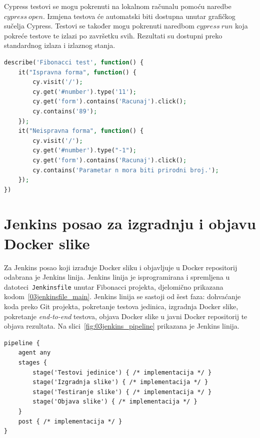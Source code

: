 Cypress testovi se mogu pokrenuti na lokalnom računalu pomoću naredbe $cypress~open$. Izmjena
testova će automatski biti dostupna unutar grafičkog sučelja Cypress. Testovi se također mogu
pokrenuti naredbom $cypress~run$ koja pokreće testove te izlazi po završetku svih. Rezultati su
dostupni preko standardnog izlaza i izlaznog stanja.

\begin{lstlisting}[language=php,float=h]
describe('Fibonacci test', function() {
    it("Ispravna forma", function() {
        cy.visit('/');
        cy.get('#number').type('11');
        cy.get('form').contains('Racunaj').click();
        cy.contains('89');
    });
    it("Neispravna forma", function() {
        cy.visit('/');
        cy.get('#number').type("-1");
        cy.get('form').contains('Racunaj').click();
        cy.contains('Parametar n mora biti prirodni broj.');
    });
})
\end{lstlisting}

\section{Jenkins posao za izgradnju i objavu Docker slike}
Za Jenkins posao koji izrađuje Docker sliku i objavljuje u Docker repositorij odabrana je Jenkins
linija. Jenkins linija je isprogramirana i spremljena u datoteci~\texttt{Jenkinsfile} unutar
Fibonacci projekta, djelomično prikazana kodom~\ref{03jenkinsfile_main}. Jenkins linija se sastoji
od šest faza: dohvaćanje koda preko Git projekta, pokretanje testova jedinica, izgradnja Docker
slike, pokretanje \textit{end-to-end} testova, objava Docker slike u javni Docker repositorij te
objava rezultata. Na slici~\ref{fig:03jenkins_pipeline} prikazana je Jenkins linija.

\begin{lstlisting}[float=h]
pipeline {
    agent any
    stages {
        stage('Testovi jedinice') { /* implementacija */ }
        stage('Izgradnja slike') { /* implementacija */ }
        stage('Testiranje slike') { /* implementacija */ }
        stage('Objava slike') { /* implementacija */ }
    }
    post { /* implementacija */ }
}
\end{lstlisting}

